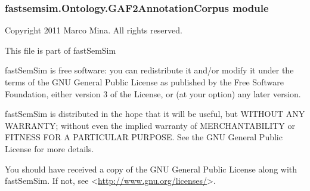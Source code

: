 \documentclass[letterpaper,10pt,english]{sphinxmanual}
\begin{document}
\subsubsection{fastsemsim.Ontology.GAF2AnnotationCorpus module}
\label{fastsemsim.Ontology:module-fastsemsim.Ontology.GAF2AnnotationCorpus}\label{fastsemsim.Ontology:fastsemsim-ontology-gaf2annotationcorpus-module}
Copyright 2011 Marco Mina. All rights reserved.

This file is part of fastSemSim

fastSemSim is free software: you can redistribute it and/or modify
it under the terms of the GNU General Public License as published by
the Free Software Foundation, either version 3 of the License, or
(at your option) any later version.

fastSemSim is distributed in the hope that it will be useful,
but WITHOUT ANY WARRANTY; without even the implied warranty of
MERCHANTABILITY or FITNESS FOR A PARTICULAR PURPOSE.  See the
GNU General Public License for more details.

You should have received a copy of the GNU General Public License
along with fastSemSim.  If not, see \textless{}\href{http://www.gnu.org/licenses/}{http://www.gnu.org/licenses/}\textgreater{}.
\end{document}
